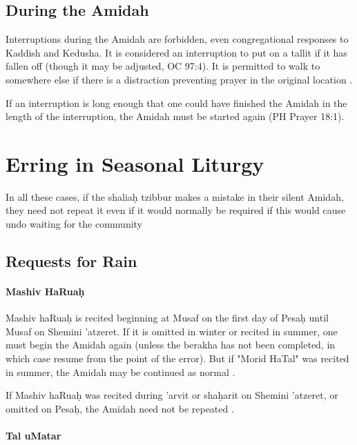 \documentclass[11pt]{article}
\begin{document}
\subsection{During the Amidah}

Interruptions during the Amidah are forbidden, even congregational responses to Kaddish and Kedusha. It is considered an interruption to put on a tallit if it has fallen off (though it may be adjusted, OC 97:4).  It is permitted to walk to somewhere else if there is a distraction preventing prayer in the original location \parencite*[17:15]{PH}.

If an interruption is long enough that one could have finished the Amidah in the length of the interruption, the Amidah must be started again (PH Prayer 18:1).

\section{Erring in Seasonal Liturgy}

In all these cases, if the shalia\d{h} tzibbur makes a mistake in their silent Amidah, they need not repeat it even if it would normally be required if this would cause undo waiting for the community \parencite*[19:13]{Kitzur}

\subsection{Requests for Rain}

\paragraph{Mashiv HaRua\d{h}}

Mashiv haRua\d{h} is recited beginning at Musaf on the first day of Pesa\d{h} until Musaf on Shemini 'atzeret.  If it is omitted in winter or recited in summer, one must begin the Amidah again (unless the berakha has not been completed, in which case resume from the point of the error).  But if "Morid HaTal" was recited in summer, the Amidah may be continued as normal \parencite*[18:4-5 citing OC 114]{PH}.

If Mashiv haRua\d{h} was recited during 'arvit or sha\d{h}arit on Shemini 'atzeret, or omitted on Pesa\d{h}, the Amidah need not be repeated \parencite*[19:2,4]{Kitzur}.

\paragraph{Tal uMatar}
\end{document}
